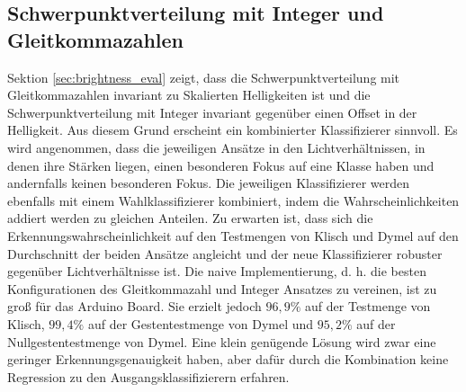 \subsection{Schwerpunktverteilung mit Integer und Gleitkommazahlen}
Sektion \ref{sec:brightness_eval} zeigt, dass die Schwerpunktverteilung mit Gleitkommazahlen invariant zu Skalierten Helligkeiten ist und die Schwerpunktverteilung mit Integer invariant
gegenüber einen Offset in der Helligkeit. Aus diesem Grund erscheint ein kombinierter Klassifizierer sinnvoll. Es wird angenommen, dass die jeweiligen Ansätze in den Lichtverhältnissen, in denen ihre
Stärken liegen, einen besonderen Fokus auf eine Klasse haben und andernfalls keinen besonderen Fokus.
\newline
\newline
Die jeweiligen Klassifizierer werden ebenfalls mit einem Wahlklassifizierer kombiniert, indem die Wahrscheinlichkeiten addiert werden zu gleichen Anteilen. Zu erwarten ist, dass sich die
Erkennungswahrscheinlichkeit auf den Testmengen von Klisch und Dymel auf den Durchschnitt der beiden Ansätze angleicht und der neue Klassifizierer robuster gegenüber Lichtverhältnisse ist.
\newline
\newline
Die naive Implementierung, d. h. die besten Konfigurationen des Gleitkommazahl und Integer Ansatzes zu vereinen, ist zu groß für das Arduino Board. Sie erzielt jedoch $96,9\%$ auf der Testmenge
von Klisch, $99,4\%$ auf der Gestentestmenge von Dymel und $95,2\%$ auf der Nullgestentestmenge von Dymel. Eine klein genügende Lösung wird zwar eine geringer Erkennungsgenauigkeit haben, aber dafür
durch die Kombination keine Regression zu den Ausgangsklassifizierern erfahren.
